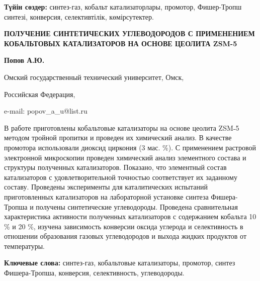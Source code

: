 {\bfseries Түйін сөздер:} синтез-газ, кобальт катализаторлары, промотор,
Фишер-Тропш синтезі, конверсия, селективтілік, көмірсутектер.

\begin{center}
{\large\bfseries ПОЛУЧЕНИЕ СИНТЕТИЧЕСКИХ УГЛЕВОДОРОДОВ С ПРИМЕНЕНИЕМ КОБАЛЬТОВЫХ
КАТАЛИЗАТОРОВ НА ОСНОВЕ ЦЕОЛИТА ZSM-5}

{\bfseries Попов А.Ю.}

Омский государственный технический университет, Омск,

Российская Федерация,

e-mail: popov\_a\_u@list.ru
\end{center}

В работе приготовлены кобальтовые катализаторы на основе цеолита ZSM˗5
методом тройной пропитки и проведен их химический анализ. В качестве
промотора использовали диоксид циркония (3 мас. \%). С применением
растровой электронной микроскопии проведен химический анализ элементного
состава и структуры полученных катализаторов. Показано, что элементный
состав катализаторов с удовлетворительной точностью соответствует их
заданному составу. Проведены эксперименты для каталитических испытаний
приготовленных катализаторов на лабораторной установке синтеза
Фишера-Тропша и получены синтетические углеводороды. Проведена
сравнительная характеристика активности полученных катализаторов с
содержанием кобальта 10 \% и 20 \%, изучена зависимость конверсии оксида
углерода и селективность в отношении образования газовых углеводородов и
выхода жидких продуктов от температуры.

{\bfseries Ключевые слова:} синтез-газ, кобальтовые катализаторы, промотор,
синтез Фишера-Тропша, конверсия, селективность, углеводороды.

